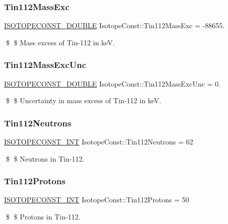 \subsubsection{\texorpdfstring{Tin112\+Mass\+Exc}{Tin112MassExc}}
{\footnotesize\ttfamily \mbox{\hyperlink{group___isotope_const-_macros_ga8f45a7272ce02c0b4c65c44636ed719a}{I\+S\+O\+T\+O\+P\+E\+C\+O\+N\+S\+T\+\_\+\+D\+O\+U\+B\+LE}} Isotope\+Const\+::\+Tin112\+Mass\+Exc = -\/88655.}

\$ \$ Mass excess of Tin-\/112 in keV. \mbox{\label{group___isotope_const-_tin-_sn112_ga1c0e76eb61719257693ba7794fb83a75}} 
\subsubsection{\texorpdfstring{Tin112\+Mass\+Exc\+Unc}{Tin112MassExcUnc}}
{\footnotesize\ttfamily \mbox{\hyperlink{group___isotope_const-_macros_ga8f45a7272ce02c0b4c65c44636ed719a}{I\+S\+O\+T\+O\+P\+E\+C\+O\+N\+S\+T\+\_\+\+D\+O\+U\+B\+LE}} Isotope\+Const\+::\+Tin112\+Mass\+Exc\+Unc = 0.}

\$ \$ Uncertainty in mass excess of Tin-\/112 in keV. \mbox{\label{group___isotope_const-_tin-_sn112_ga5b102e50de4cf92a46c036438005ad7f}} 
\subsubsection{\texorpdfstring{Tin112\+Neutrons}{Tin112Neutrons}}
{\footnotesize\ttfamily \mbox{\hyperlink{group___isotope_const-_macros_ga5f18360b3e99483a35c32d789e62621c}{I\+S\+O\+T\+O\+P\+E\+C\+O\+N\+S\+T\+\_\+\+I\+NT}} Isotope\+Const\+::\+Tin112\+Neutrons = 62}

\$ \$ Neutrons in Tin-\/112. \mbox{\label{group___isotope_const-_tin-_sn112_ga52acc97de7e8085c5be6ff4d1b8d51a0}} 
\subsubsection{\texorpdfstring{Tin112\+Protons}{Tin112Protons}}
{\footnotesize\ttfamily \mbox{\hyperlink{group___isotope_const-_macros_ga5f18360b3e99483a35c32d789e62621c}{I\+S\+O\+T\+O\+P\+E\+C\+O\+N\+S\+T\+\_\+\+I\+NT}} Isotope\+Const\+::\+Tin112\+Protons = 50}

\$ \$ Protons in Tin-\/112. 